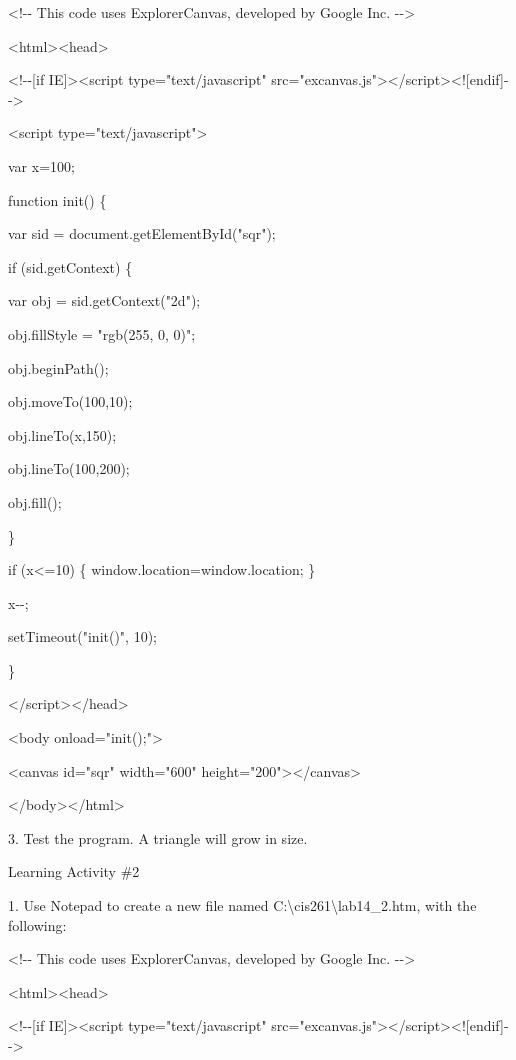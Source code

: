 \documentclass[
]{article}
\begin{document}
\textless!-\/- This code uses ExplorerCanvas, developed by Google Inc.
-\/-\textgreater{}

\textless html\textgreater\textless head\textgreater{}

\textless!-\/-{[}if IE{]}\textgreater\textless script
type="text/javascript"
src="excanvas.js"\textgreater\textless/script\textgreater\textless!{[}endif{]}-\/-\textgreater{}

\textless script type="text/javascript"\textgreater{}

var x=100;

function init() \{

var sid = document.getElementById("sqr");

if (sid.getContext) \{

var obj = sid.getContext("2d");

obj.fillStyle = "rgb(255, 0, 0)";

obj.beginPath();

obj.moveTo(100,10);

obj.lineTo(x,150);

obj.lineTo(100,200);

obj.fill();

\}

if (x\textless=10) \{ window.location=window.location; \}

x-\/-;

setTimeout("init()", 10);

\}

\textless/script\textgreater\textless/head\textgreater{}

\textless body onload="init();"\textgreater{}

\textless canvas id="sqr" width="600"
height="200"\textgreater\textless/canvas\textgreater{}

\textless/body\textgreater\textless/html\textgreater{}

3. Test the program. A triangle will grow in size.

Learning Activity \#2

1. Use Notepad to create a new file named
C:\textbackslash cis261\textbackslash lab14\_2.htm, with the following:

\textless!-\/- This code uses ExplorerCanvas, developed by Google Inc.
-\/-\textgreater{}

\textless html\textgreater\textless head\textgreater{}

\textless!-\/-{[}if IE{]}\textgreater\textless script
type="text/javascript"
src="excanvas.js"\textgreater\textless/script\textgreater\textless!{[}endif{]}-\/-\textgreater{}
\end{document}
